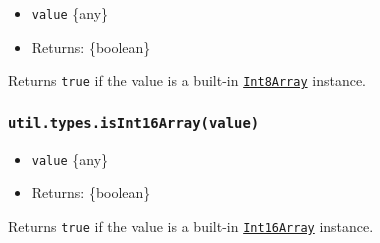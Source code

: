 \begin{itemize}
\tightlist
\item
  \texttt{value} \{any\}
\item
  Returns: \{boolean\}
\end{itemize}

Returns \texttt{true} if the value is a built-in
\href{https://developer.mozilla.org/en-US/docs/Web/JavaScript/Reference/Global_Objects/Int8Array}{\texttt{Int8Array}}
instance.

\begin{Shaded}
\begin{Highlighting}[]
\NormalTok{(} \NormalTok{())}\OperatorTok{;}  
\NormalTok{(} \NormalTok{())}\OperatorTok{;}  
\NormalTok{(} \NormalTok{())}\OperatorTok{;}  
\end{Highlighting}
\end{Shaded}

\subsubsection{\texorpdfstring{\texttt{util.types.isInt16Array(value)}}{util.types.isInt16Array(value)}}\label{util.types.isint16arrayvalue}

\begin{itemize}
\tightlist
\item
  \texttt{value} \{any\}
\item
  Returns: \{boolean\}
\end{itemize}

Returns \texttt{true} if the value is a built-in
\href{https://developer.mozilla.org/en-US/docs/Web/JavaScript/Reference/Global_Objects/Int16Array}{\texttt{Int16Array}}
instance.

\begin{Shaded}
\begin{Highlighting}[]
\NormalTok{(} \NormalTok{())}\OperatorTok{;}  
\NormalTok{(} \NormalTok{())}\OperatorTok{;}  
\NormalTok{(} \NormalTok{())}\OperatorTok{;}  
\end{Highlighting}
\end{Shaded}

